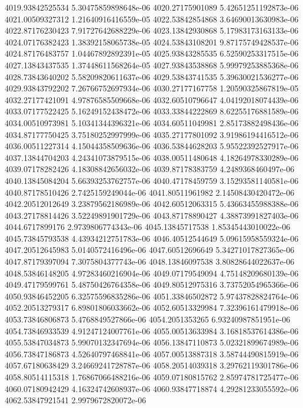 {4019.93842525534 5.30475859898648e-06
4020.27175901089 5.42651251192873e-06
4021.00509327312 1.21640916416559e-05
4022.53842854868 3.64690013630983e-06
4022.87176230423 7.91727642688229e-06
4023.13842930868 5.17983173163133e-06
4024.07176382423 1.38392158065738e-05
4024.53843108201 9.87175749428537e-06
4024.87176483757 1.04467892892391e-05
4025.93843285535 6.52590253317515e-06
4027.13843437535 1.37448611568264e-05
4027.93843538868 5.99979253885368e-06
4028.73843640202 5.58209820611637e-06
4029.53843741535 5.39630021536277e-06
4029.93843792202 7.26766752697934e-06
4030.27177167758 1.20590325867819e-05
4032.27177421091 4.97876585509668e-06
4032.60510796647 4.04192018074439e-06
4033.07177522425 5.16249152438472e-06
4033.33844222869 8.62255176881589e-06
4034.00510973981 5.10341344396321e-06
4034.60511049981 2.85173882498436e-06
4034.87177750425 3.75180252997999e-06
4035.27177801092 3.91986194416512e-06
4036.00511227314 4.15044358509636e-06
4036.53844628203 5.95522392527917e-06
4037.13844704203 4.24341073879515e-06
4038.00511480648 4.18264978330289e-06
4039.07178282426 4.18308842656032e-06
4039.87178383759 4.2489368460497e-06
4040.13845084204 5.66393253762757e-06
4040.47178459759 3.15293581140581e-06
4040.87178510426 2.7425159249044e-06
4041.80511961982 2.14508430420472e-06
4042.20512012649 3.23879562186989e-06
4042.60512063315 5.43663455988388e-06
4043.27178814426 3.52249891901729e-06
4043.87178890427 4.38873991827403e-06
4044.6717899176 2.9739806774343e-06
4045.13845717538 1.85345443010022e-06
4045.73845793538 4.43934212751783e-06
4046.40512544649 5.09615958559324e-06
4047.20512645983 5.0140572416496e-06
4047.60512696649 5.34271017827365e-06
4047.87179397094 7.3075804377743e-06
4048.13846097538 3.80828644022637e-06
4048.53846148205 4.97283460216904e-06
4049.07179549094 4.75148209680139e-06
4049.47179599761 5.48750426764358e-06
4049.80512975316 3.73752054965366e-06
4050.93846452205 6.32575596835286e-06
4051.33846502872 5.97437828824764e-06
4052.20513279317 6.89801806033662e-06
4052.60513329984 7.32396161479918e-06
4053.73846806873 5.4768849527866e-06
4054.2051353265 6.93240987851951e-06
4054.73846933539 4.91247124007761e-06
4055.00513633984 3.16818537614386e-06
4055.53847034873 5.99070132347694e-06
4056.13847110873 5.02321899674989e-06
4056.73847186873 4.52640797468841e-06
4057.00513887318 3.58744490815919e-06
4057.67180638429 3.24669241728787e-06
4058.20514039318 3.29762119301786e-06
4058.80514115318 1.76867066488216e-06
4059.07180815762 2.85974781725477e-06
4060.07180942429 4.16324742608937e-06
4060.93847718874 4.29281233055592e-06
4062.53847921541 2.9979672820072e-06
}

